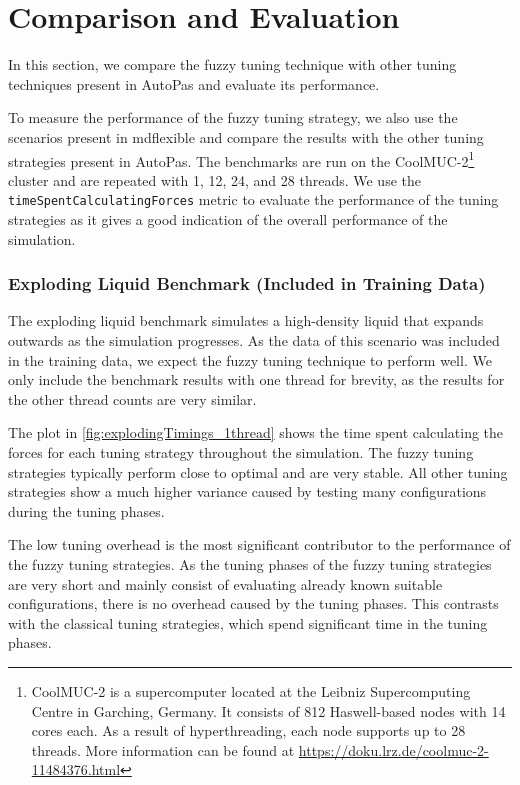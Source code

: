 \chapter{Comparison and Evaluation}
\label{sec:comparison_and_evaluation}

In this section, we compare the fuzzy tuning technique with other tuning techniques present in AutoPas and evaluate its performance.

To measure the performance of the fuzzy tuning strategy, we also use the scenarios present in \gls{mdflexible} and compare the results with the other tuning strategies present in AutoPas. The benchmarks are run on the CoolMUC-2\footnote{\label{CoolMucSpecs}CoolMUC-2 is a supercomputer located at the Leibniz Supercomputing Centre in Garching, Germany. It consists of 812 Haswell-based nodes with 14 cores each. As a result of hyperthreading, each node supports up to 28 threads. More information can be found at \url{https://doku.lrz.de/coolmuc-2-11484376.html}} cluster and are repeated with 1, 12, 24, and 28 threads. We use the \texttt{timeSpentCalculatingForces} metric to evaluate the performance of the tuning strategies as it gives a good indication of the overall performance of the simulation.


\subsection{Exploding Liquid Benchmark (Included in Training Data)}

The exploding liquid benchmark simulates a high-density liquid that expands outwards as the simulation progresses. As the data of this scenario was included in the training data, we expect the fuzzy tuning technique to perform well. We only include the benchmark results with one thread for brevity, as the results for the other thread counts are very similar.

The plot in \autoref{fig:explodingTimings_1thread} shows the time spent calculating the forces for each tuning strategy throughout the simulation. The fuzzy tuning strategies typically perform close to optimal and are very stable. All other tuning strategies show a much higher variance caused by testing many configurations during the tuning phases.

The low tuning overhead is the most significant contributor to the performance of the fuzzy tuning strategies. As the tuning phases of the fuzzy tuning strategies are very short and mainly consist of evaluating already known suitable configurations, there is no overhead caused by the tuning phases. This contrasts with the classical tuning strategies, which spend significant time in the tuning phases.

